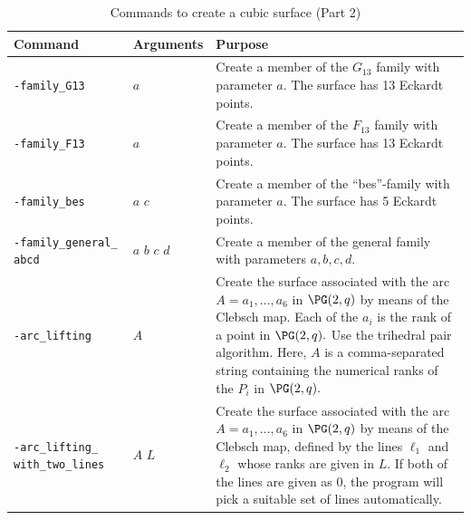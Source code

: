 \begin{table}
\begin{center}
\begin{tabular}{|p{4cm}|p{3cm}|p{7cm}|}
\hline
Command & Arguments & Purpose \\
\hline
\hline
\verb'-family_G13' & $a$   & 
Create a member of the $G_{13}$ family with parameter $a$. 
The surface has 13 Eckardt points. \\
\hline
\verb'-family_F13' & $a$   & 
Create a member of the $F_{13}$ family with parameter $a$. 
The surface has 13 Eckardt points. \\
\hline
\verb'-family_bes' & $a$ $c$  & 
Create a member of the ``bes''-family with parameter $a$. 
The surface has 5 Eckardt points. \\
\hline
\verb'-family_general_' \verb'abcd' & $a$ $b$ $c$ $d$  & 
Create a member of the general family with parameters $a,b,c,d$. \\
\hline
\verb'-arc_lifting' & $A$    & 
Create the surface associated with the arc 
$A=a_1,\ldots,a_6$ in $\PG(2,q)$ by means of the Clebsch map. 
Each of the $a_i$ is the rank of a point in $\PG(2,q).$ 
Use the trihedral pair algorithm. 
Here, $A$ is a comma-separated string containing the numerical 
ranks of the $P_i$ in $\PG(2,q).$\\
\hline
\verb'-arc_lifting_' \verb'with_two_lines' & $A$  $L$  & 
Create the surface associated with the arc 
$A=a_1,\ldots,a_6$ in $\PG(2,q)$ by means of the Clebsch map, 
defined by the lines $\ell_1$ and $\ell_2$ whose ranks are given in $L$.
If both of the lines are given as 0, the program will pick a 
suitable set of lines automatically.\\ 
\hline
\end{tabular}
\end{center}
\caption{\label{tab:createsurface:two}Commands to create a cubic surface (Part 2)}
\end{table}
